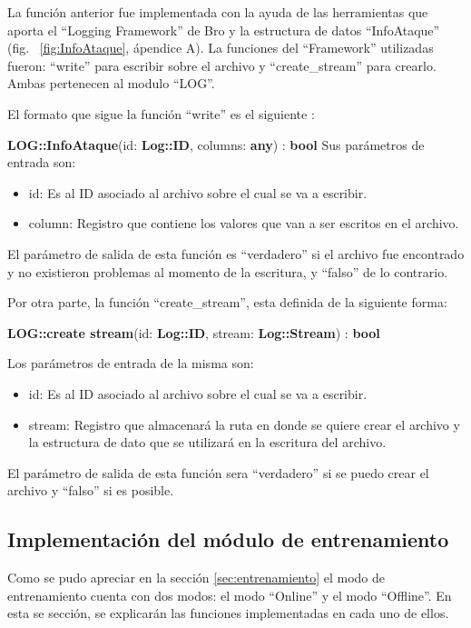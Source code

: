 La función anterior fue implementada con la ayuda de las herramientas
que aporta el ``Logging Framework'' de Bro y la estructura de datos ``InfoAtaque'' (fig. ~\ref{fig:InfoAtaque}, ápendice A). La funciones del ``Framework'' utilizadas fueron: ``write'' para escribir sobre el archivo y ``create\_stream'' para crearlo. Ambas pertenecen al modulo ``LOG''. 

El formato que sigue la función ``write'' es el siguiente :

\textbf{LOG::InfoAtaque}(id: \textbf{Log::ID}, columns: \textbf{any}) : \textbf{bool}
Sus parámetros de entrada son:

\begin{itemize}
\item id: Es al ID asociado al archivo sobre el cual se va a escribir.
\item column: Registro que contiene los valores que van a ser escritos en el
archivo.
\end{itemize}

El parámetro de salida de esta función es ``verdadero'' si el archivo fue encontrado y no existieron problemas al momento de la escritura, y ``falso'' de
lo contrario.

Por otra parte, la función ``create\_stream'', esta definida de la siguiente
forma:

\textbf{LOG::create stream}(id: \textbf{Log::ID}, stream: \textbf{Log::Stream}) : \textbf{bool}

Los parámetros de entrada de la misma son:

\begin{itemize}
\item id: Es al ID asociado al archivo sobre el cual se va a escribir.
\item stream: Registro que almacenará la ruta en donde se quiere crear el
archivo y la estructura de dato que se utilizará en la escritura del
archivo.
\end{itemize}

El parámetro de salida de esta función sera ``verdadero'' si se puedo crear el
archivo y ``falso'' si es posible.


\subsection{Implementación del módulo de entrenamiento}

Como se pudo apreciar en la sección \ref{sec:entrenamiento} el modo de entrenamiento cuenta con dos modos: el modo ``Online'' y el modo ``Offline''. En esta se sección, se explicarán las funciones implementadas en cada uno de ellos.

